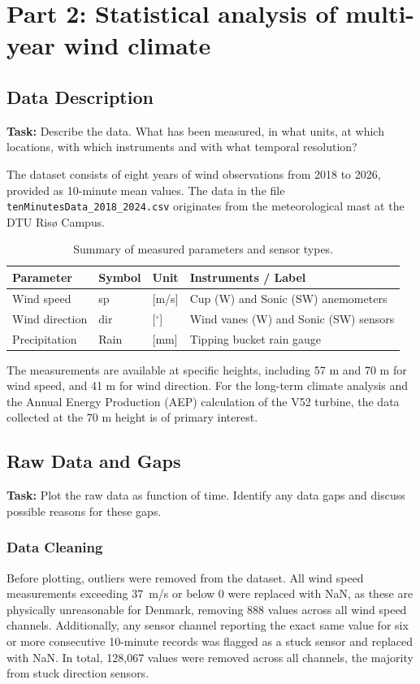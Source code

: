 \section{Part 2: Statistical analysis of multi-year wind climate}
\label{sec:part2}

\subsection{Data Description}
\textbf{Task:} Describe the data. What has been measured, in what units, at which locations, with which instruments and with what temporal resolution?

The dataset consists of eight years of wind observations from 2018 to 2026, provided as 10-minute mean values. 
The data in the file \texttt{tenMinutesData\_2018\_2024.csv} originates from the meteorological mast at the DTU Risø Campus.

\begin{table}[H]
    \centering
    \begin{tabular}{llll}
        \toprule
        \textbf{Parameter} & \textbf{Symbol} & \textbf{Unit} & \textbf{Instruments / Label} \\
        \midrule
        Wind speed & sp & [m/s] & Cup (W) and Sonic (SW) anemometers \\
        Wind direction & dir & [$^\circ$] & Wind vanes (W) and Sonic (SW) sensors \\
        Precipitation & Rain & [mm] & Tipping bucket rain gauge \\
        \bottomrule
    \end{tabular}
    \caption{Summary of measured parameters and sensor types.}
\end{table}

The measurements are available at specific heights, including 57 m and 70 m for wind speed, and 41 m for wind direction. For the long-term climate analysis and the Annual Energy Production (AEP) calculation of the V52 turbine, the data collected at the 70 m height is of primary interest.

\subsection{Raw Data and Gaps}
\textbf{Task:} Plot the raw data as function of time. Identify any data gaps and discuss possible reasons for these gaps.

\subsubsection{Data Cleaning}
Before plotting, outliers were removed from the dataset. All wind speed measurements exceeding 37~m/s or below 0 were replaced with NaN, as these are physically unreasonable for Denmark, removing 888 values across all wind speed channels. Additionally, any sensor channel reporting the exact same value for six or more consecutive 10-minute records was flagged as a stuck sensor and replaced with NaN. In total, 128,067 values were removed across all channels, the majority from stuck direction sensors.

